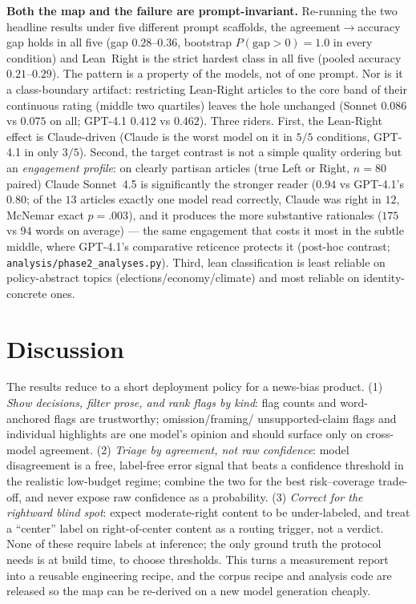 \documentclass{article}
\begin{document}
\textbf{Both the map and the failure are prompt-invariant.} Re-running
the two headline results under five different prompt scaffolds, the
agreement$\to$accuracy gap holds in all five (gap $0.28$--$0.36$,
bootstrap $P(\text{gap}{>}0){=}1.0$ in every condition) and Lean~Right is
the strict hardest class in all five (pooled accuracy $0.21$--$0.29$).
The pattern is a property of the models, not of one prompt. Nor is it
a class-boundary artifact: restricting Lean-Right articles to the core
band of their continuous rating (middle two quartiles) leaves the hole
unchanged (Sonnet $0.086$ vs $0.075$ on all; GPT-4.1 $0.412$ vs
$0.462$). Three riders. First, the Lean-Right effect is Claude-driven
(Claude is the worst model on it in $5/5$ conditions, GPT-4.1 in only
$3/5$). Second, the target contrast is not a simple quality ordering
but an \emph{engagement profile}: on clearly partisan articles (true
Left or Right, $n{=}80$ paired) Claude Sonnet~4.5 is significantly the
stronger reader ($0.94$ vs GPT-4.1's $0.80$; of the $13$ articles
exactly one model read correctly, Claude was right in $12$, McNemar
exact $p{=}.003$), and it produces the more substantive rationales
($175$ vs $94$ words on average) --- the same engagement that costs it
most in the subtle middle, where GPT-4.1's comparative reticence
protects it (post-hoc contrast;
\texttt{analysis/phase2\_analyses.py}). Third, lean classification is
least reliable on policy-abstract topics (elections/economy/climate) and
most reliable on identity-concrete ones.

\section{Discussion}
The results reduce to a short deployment policy for a news-bias product.
(1) \emph{Show decisions, filter prose, and rank flags by kind}: flag
counts and word-anchored flags are trustworthy; omission/framing/
unsupported-claim flags and individual highlights are one model's opinion
and should surface only on cross-model agreement. (2) \emph{Triage by
agreement, not raw confidence}: model disagreement is a free,
label-free error signal that beats a confidence threshold in the
realistic low-budget regime; combine the two for the best risk--coverage
trade-off, and never expose raw confidence as a probability. (3)
\emph{Correct for the rightward blind spot}: expect moderate-right
content to be under-labeled, and treat a ``center'' label on
right-of-center content as a routing trigger, not a verdict. None of
these require labels at inference; the only ground truth the protocol
needs is at build time, to choose thresholds. This turns a measurement
report into a reusable engineering recipe, and the corpus recipe and
analysis code are released so the map can be re-derived on a new model
generation cheaply.
\end{document}
